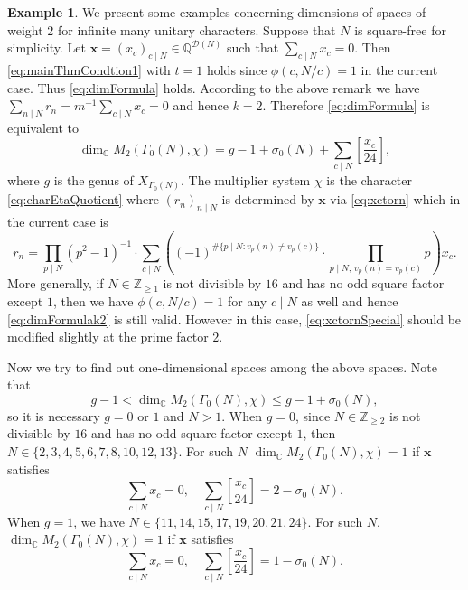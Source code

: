 \documentclass[12pt]{amsart}
\numberwithin{equation}{section}
\theoremstyle{plain}
\theoremstyle{definition}
\newtheorem{examp}[thm]{Example}
\theoremstyle{remark}
\newcommand\numQ{\mathbb{Q}}
\newcommand\numC{\mathbb{C}}
\newcommand\numgeq[2]{\mathbb{#1}_{\geq #2}}
\begin{document}
\begin{examp}
We present some examples concerning dimensions of spaces of weight $2$ for infinite many unitary characters. Suppose that $N$ is square-free for simplicity. Let $\mathbf{x}=(x_c)_{c\mid N}\in\numQ^{\mathscr{D}(N)}$ such that $\sum_{c\mid N}x_c=0$. Then \eqref{eq:mainThmCondtion1} with $t=1$ holds since $\phi(c,N/c)=1$ in the current case. Thus \eqref{eq:dimFormula} holds. According to the above remark we have $\sum_{n\mid N}r_n=m^{-1}\sum_{c\mid N}x_c=0$ and hence $k=2$. Therefore \eqref{eq:dimFormula} is equivalent to
\begin{equation}
\label{eq:dimFormulak2}
\dim_\numC M_2(\Gamma_0(N), \chi)=g-1+\sigma_0(N)+\sum_{c\mid N}\left[\frac{x_c}{24}\right],
\end{equation}
where $g$ is the genus of $X_{\Gamma_0(N)}$. The multiplier system $\chi$ is the character \eqref{eq:charEtaQuotient} where $(r_n)_{n\mid N}$ is determined by $\mathbf{x}$ via \eqref{eq:xctorn} which in the current case is
\begin{equation}
\label{eq:xctornSpecial}
r_n=\prod_{p\mid N}(p^2-1)^{-1}\cdot \sum_{c\mid N}\left((-1)^{\#\{p\mid N\colon v_p(n)\neq v_p(c)\}}\cdot\prod_{p\mid N,\,v_p(n)=v_p(c)}p\right)x_c.
\end{equation}
More generally, if $N\in\numgeq{Z}{1}$ is not divisible by $16$ and has no odd square factor except $1$, then we have $\phi(c,N/c)=1$ for any $c\mid N$ as well and hence \eqref{eq:dimFormulak2} is still valid. However in this case, \eqref{eq:xctornSpecial} should be modified slightly at the prime factor $2$.

Now we try to find out one-dimensional spaces among the above spaces. Note that
\begin{equation*}
g-1<\dim_\numC M_2(\Gamma_0(N), \chi)\leq g-1+\sigma_0(N),
\end{equation*}
so it is necessary $g=0$ or $1$ and $N>1$. When $g=0$, since $N\in\numgeq{Z}{2}$ is not divisible by $16$ and has no odd square factor except $1$, then $N\in\{2,3,4,5,6,7,8,10,12,13\}$. For such $N$ $\dim_\numC M_2(\Gamma_0(N), \chi)=1$ if $\mathbf{x}$ satisfies
\begin{equation*}
\sum_{c\mid N}x_c=0,\quad \sum_{c\mid N}\left[\frac{x_c}{24}\right]=2-\sigma_0(N).
\end{equation*}
When $g=1$, we have $N\in\{11,14,15,17,19,20,21,24\}$. For such $N$, $\dim_\numC M_2(\Gamma_0(N), \chi)=1$ if $\mathbf{x}$ satisfies
\begin{equation*}
\sum_{c\mid N}x_c=0,\quad \sum_{c\mid N}\left[\frac{x_c}{24}\right]=1-\sigma_0(N).
\end{equation*}


\end{examp}
\end{document}
